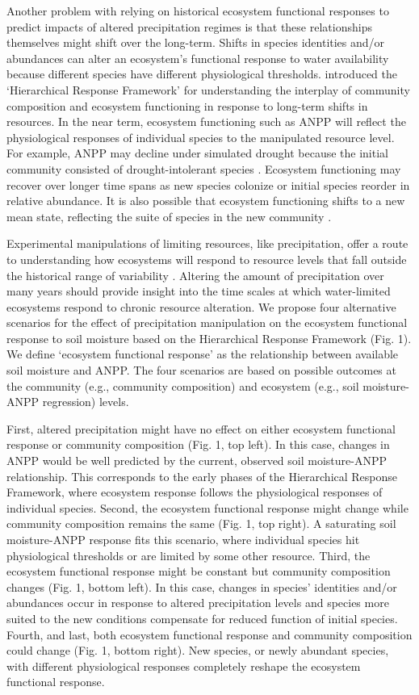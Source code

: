 \documentclass[fleqn,10pt,lineno]{wlpeerj} %
\begin{document}
Another problem with relying on historical ecosystem functional
responses to predict impacts of altered precipitation regimes is that
these relationships themselves might shift over the long-term. Shifts in
species identities and/or abundances can alter an ecosystem's functional
response to water availability because different species have different
physiological thresholds. \citet{Smith2009} introduced the `Hierarchical
Response Framework' for understanding the interplay of community
composition and ecosystem functioning in response to long-term shifts in
resources. In the near term, ecosystem functioning such as ANPP will
reflect the physiological responses of individual species to the
manipulated resource level. For example, ANPP may decline under
simulated drought because the initial community consisted of
drought-intolerant species \citep{Hoover2014}. Ecosystem functioning may
recover over longer time spans as new species colonize or initial
species reorder in relative abundance. It is also possible that
ecosystem functioning shifts to a new mean state, reflecting the suite
of species in the new community \citep{Knapp2012}.

Experimental manipulations of limiting resources, like precipitation,
offer a route to understanding how ecosystems will respond to resource
levels that fall outside the historical range of variability
\citep{Avolio2015, Gherardi2015, Knapp2017}. Altering the amount of
precipitation over many years should provide insight into the time
scales at which water-limited ecosystems respond to chronic resource
alteration. We propose four alternative scenarios for the effect of
precipitation manipulation on the ecosystem functional response to soil
moisture based on the Hierarchical Response Framework (Fig. 1). We
define `ecosystem functional response' as the relationship between
available soil moisture and ANPP. The four scenarios are based on
possible outcomes at the community (e.g., community composition) and
ecosystem (e.g., soil moisture-ANPP regression) levels.

First, altered precipitation might have no effect on either ecosystem
functional response or community composition (Fig. 1, top left). In this
case, changes in ANPP would be well predicted by the current, observed
soil moisture-ANPP relationship. This corresponds to the early phases of
the Hierarchical Response Framework, where ecosystem response follows
the physiological responses of individual species. Second, the ecosystem
functional response might change while community composition remains the
same (Fig. 1, top right). A saturating soil moisture-ANPP response fits
this scenario, where individual species hit physiological thresholds or
are limited by some other resource. Third, the ecosystem functional
response might be constant but community composition changes (Fig. 1,
bottom left). In this case, changes in species' identities and/or
abundances occur in response to altered precipitation levels and species
more suited to the new conditions compensate for reduced function of
initial species. Fourth, and last, both ecosystem functional response
and community composition could change (Fig. 1, bottom right). New
species, or newly abundant species, with different physiological
responses completely reshape the ecosystem functional response.
\end{document}
